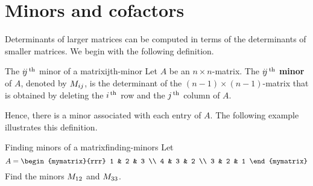 \section{Minors and cofactors}

Determinants of larger matrices can be computed in terms of the
determinants of smaller matrices. We begin with the following
definition.

\begin{definition}{The $\ijth$ minor of a matrix}{ijth-minor}
  Let $A$ be an $n\times n$-matrix. The $\ijth$ \textbf{minor}%
   of $A$, denoted by $\minor{A}{ij}$, is the
  determinant of the $(n-1)\times(n-1)$-matrix that is obtained by
  deleting the $i\th$ row and the $j\th$ column of $A$.
\end{definition}

Hence, there is a minor associated with each entry of $A$. The
following example illustrates this definition.

\begin{example}{Finding minors of a matrix}{finding-minors}
  Let
  \begin{equation*}
    A = \begin{mymatrix}{rrr}
      1 & 2 & 3 \\
      4 & 3 & 2 \\
      3 & 2 & 1
    \end{mymatrix}
  \end{equation*}
  Find the minors $\minor{A}{12}$ and $\minor{A}{33}$.
\end{example}

